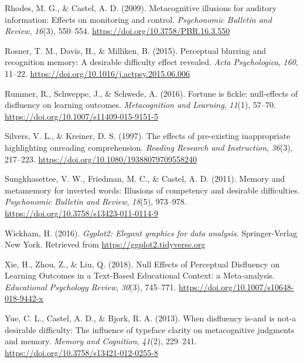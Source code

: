 \documentclass[english,pdf]{apa6}
\begin{document}
\leavevmode\hypertarget{ref-Rhodes2009}{}%
Rhodes, M. G., \& Castel, A. D. (2009). Metacognitive illusions for auditory information: Effects on monitoring and control. \emph{Psychonomic Bulletin and Review}, \emph{16}(3), 550--554. \url{https://doi.org/10.3758/PBR.16.3.550}

\leavevmode\hypertarget{ref-Rosner2015}{}%
Rosner, T. M., Davis, H., \& Milliken, B. (2015). Perceptual blurring and recognition memory: A desirable difficulty effect revealed. \emph{Acta Psychologica}, \emph{160}, 11--22. \url{https://doi.org/10.1016/j.actpsy.2015.06.006}

\leavevmode\hypertarget{ref-Rummer2016}{}%
Rummer, R., Schweppe, J., \& Schwede, A. (2016). Fortune is fickle: null-effects of disfluency on learning outcomes. \emph{Metacognition and Learning}, \emph{11}(1), 57--70. \url{https://doi.org/10.1007/s11409-015-9151-5}

\leavevmode\hypertarget{ref-Silvers1997}{}%
Silvers, V. L., \& Kreiner, D. S. (1997). The effects of pre-existing inappropriate highlighting onreading comprehension. \emph{Reading Research and Instruction}, \emph{36}(3), 217--223. \url{https://doi.org/10.1080/19388079709558240}

\leavevmode\hypertarget{ref-Sungkhasettee2011}{}%
Sungkhasettee, V. W., Friedman, M. C., \& Castel, A. D. (2011). Memory and metamemory for inverted words: Illusions of competency and desirable difficulties. \emph{Psychonomic Bulletin and Review}, \emph{18}(5), 973--978. \url{https://doi.org/10.3758/s13423-011-0114-9}

\leavevmode\hypertarget{ref-Wickham2016}{}%
Wickham, H. (2016). \emph{Ggplot2: Elegant graphics for data analysis}. Springer-Verlag New York. Retrieved from \url{https://ggplot2.tidyverse.org}

\leavevmode\hypertarget{ref-Xie2018}{}%
Xie, H., Zhou, Z., \& Liu, Q. (2018). Null Effects of Perceptual Disfluency on Learning Outcomes in a Text-Based Educational Context: a Meta-analysis. \emph{Educational Psychology Review}, \emph{30}(3), 745--771. \url{https://doi.org/10.1007/s10648-018-9442-x}

\leavevmode\hypertarget{ref-Yue2013}{}%
Yue, C. L., Castel, A. D., \& Bjork, R. A. (2013). When disfluency is-and is not-a desirable difficulty: The influence of typeface clarity on metacognitive judgments and memory. \emph{Memory and Cognition}, \emph{41}(2), 229--241. \url{https://doi.org/10.3758/s13421-012-0255-8}

\endgroup
\end{document}
